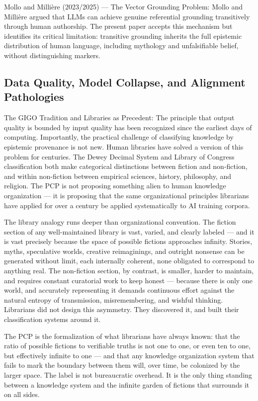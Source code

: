 \documentclass[12pt]{article}
\begin{document}
Mollo and Millière (2023/2025) --- The Vector Grounding Problem: Mollo
and Millière argued that LLMs can achieve genuine referential grounding
transitively through human authorship. The present paper accepts this
mechanism but identifies its critical limitation: transitive grounding
inherits the full epistemic distribution of human language, including
mythology and unfalsifiable belief, without distinguishing markers.

\subsection{Data Quality, Model Collapse, and Alignment Pathologies}\label{b.3-data-quality-model-collapse-and-alignment-pathologies}

The GIGO Tradition and Libraries as Precedent: The principle that output
quality is bounded by input quality has been recognized since the
earliest days of computing. Importantly, the practical challenge of
classifying knowledge by epistemic provenance is not new. Human
libraries have solved a version of this problem for centuries. The Dewey
Decimal System and Library of Congress classification both make
categorical distinctions between fiction and non-fiction, and within
non-fiction between empirical sciences, history, philosophy, and
religion. The PCP is not proposing something alien to human knowledge
organization --- it is proposing that the same organizational principles
librarians have applied for over a century be applied systematically to
AI training corpora.

The library analogy runs deeper than organizational convention. The
fiction section of any well-maintained library is vast, varied, and
clearly labeled --- and it is vast precisely because the space of
possible fictions approaches infinity. Stories, myths, speculative
worlds, creative reimaginings, and outright nonsense can be generated
without limit, each internally coherent, none obligated to correspond to
anything real. The non-fiction section, by contrast, is smaller, harder
to maintain, and requires constant curatorial work to keep honest ---
because there is only one world, and accurately representing it demands
continuous effort against the natural entropy of transmission,
misremembering, and wishful thinking. Librarians did not design this
asymmetry. They discovered it, and built their classification systems
around it.

The PCP is the formalization of what librarians have always known: that
the ratio of possible fictions to verifiable truths is not one to one,
or even ten to one, but effectively infinite to one --- and that any
knowledge organization system that fails to mark the boundary between
them will, over time, be colonized by the larger space. The label is not
bureaucratic overhead. It is the only thing standing between a knowledge
system and the infinite garden of fictions that surrounds it on all
sides.
\end{document}

